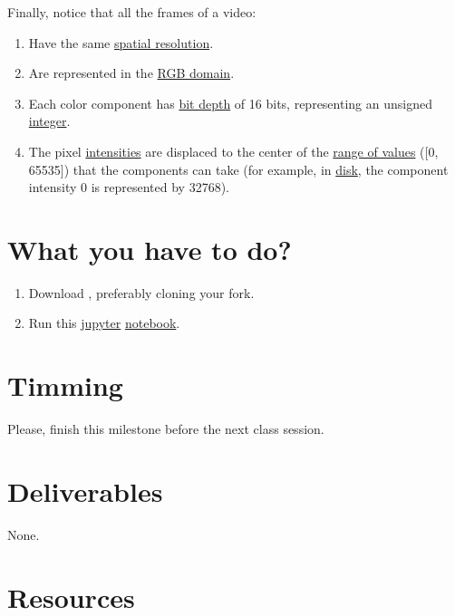 Finally, notice that all the frames of a video:
\begin{enumerate}
\item Have the same
  \href{https://en.wikipedia.org/wiki/Image_resolution}{spatial
    resolution}.
\item Are represented in the
  \href{https://en.wikipedia.org/wiki/RGB_color_model}{RGB domain}.
\item Each color component has
  \href{https://en.wikipedia.org/wiki/Glossary_of_computer_graphics#bit_depth}{bit
    depth} of 16 bits, representing an unsigned
  \href{https://en.wikipedia.org/wiki/Integer_(computer_science)}{integer}.
\item The pixel
  \href{https://en.wikipedia.org/wiki/Luminous_intensity}{intensities}
  are displaced to the center of the
  \href{https://en.wikipedia.org/wiki/Range_(computer_programming)}{range
    of values} ([0, 65535]) that the components can take (for example,
  in \href{https://en.wikipedia.org/wiki/Disk_storage}{disk}, the
  component intensity 0 is represented by 32768).
\end{enumerate}
  
\section{What you have to do?}

\begin{enumerate}
\item Download \theproject{}, preferably cloning your fork.
\item Run this \href{https://jupyter.org/}{jupyter}
  \href{https://github.com/Sistemas-Multimedia/Sistemas-Multimedia.github.io/blob/master/study_guide/04-the_data/display_video.ipynb}{notebook}.
\end{enumerate}

\section{Timming}

Please, finish this milestone before the next class session.

\section{Deliverables}

None.

\section{Resources}


